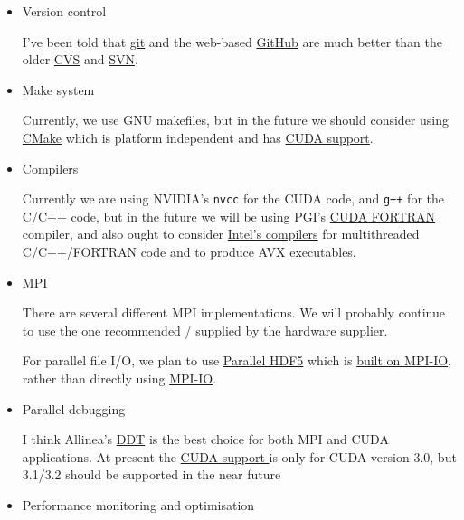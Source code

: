 \documentclass[12pt]{article}
\begin{document}
\begin{itemize}

\item
Version control

I've been told that 
\href{http://git-scm.com/}{git}
and the web-based 
\href{http://github.com/}{GitHub}
are much better than the older
\href{http://www.nongnu.org/cvs/}{CVS} 
and
\href{http://subversion.apache.org/}{SVN}.

\item 
Make system

Currently, we use GNU makefiles, but in the future we should
consider using 
\href{http://en.wikipedia.org/wiki/CMake}{CMake}
which is platform independent and has
\href{http://rafaelpalomar.net/blog/2010/jan/22/building-cuda-projects-cmake}{CUDA support}.


\item
Compilers

Currently we are using NVIDIA's {\tt nvcc} for the CUDA code, 
and {\tt g++} for the C/C++ code, but in the future we will
be using PGI's
\href{http://www.pgroup.com/resources/cudafortran.htm}{CUDA FORTRAN}
compiler, and also ought to consider
\href{http://software.intel.com/en-us/intel-compilers/}{Intel's compilers}
for multithreaded C/C++/FORTRAN code and to produce AVX executables.


\item
MPI

There are several different MPI implementations.  We will probably
continue to use the one recommended / supplied by the hardware supplier.

For parallel file I/O, we plan to use
\href{http://www.hdfgroup.org/HDF5/PHDF5/}{Parallel HDF5}
which is 
\href{http://www.hdfgroup.org/HDF5/Tutor/poverview.html}{built on MPI-IO}, 
rather than directly using
\href{http://www.nersc.gov/nusers/resources/software/libs/io/mpiio.php}{MPI-IO}.


\item
Parallel debugging

I think Allinea's 
\href{http://www.allinea.com/?page=48}{DDT}
is the best choice for both MPI and CUDA applications. At present the 
\href{http://www.allinea.com/?page=131}{CUDA support }
is only for CUDA version 3.0, but 3.1/3.2 should be supported in the near future


\item
Performance monitoring and optimisation


\end{itemize}
\end{document}
